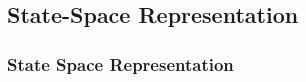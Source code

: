 \documentclass[hyperref={pdfpagelabels=false}]{beamer}
\begin{document}
\subsection{State-Space Representation}

\begin{frame}
\frametitle{State Space Representation}




\end{frame}
\end{document}
